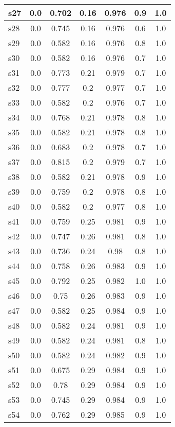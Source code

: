 \documentclass{article}
\begin{document}
\begin{tabular}{|l|c|c|c|c|c|c|}
\hline
s27 &0.0 & 0.702 & 0.16 & 0.976 & 0.9 & 1.0\\
\hline
s28 &0.0 & 0.745 & 0.16 & 0.976 & 0.6 & 1.0\\
\hline
s29 &0.0 & 0.582 & 0.16 & 0.976 & 0.8 & 1.0\\
\hline
s30 &0.0 & 0.582 & 0.16 & 0.976 & 0.7 & 1.0\\
\hline
s31 &0.0 & 0.773 & 0.21 & 0.979 & 0.7 & 1.0\\
\hline
s32 &0.0 & 0.777 & 0.2 & 0.977 & 0.7 & 1.0\\
\hline
s33 &0.0 & 0.582 & 0.2 & 0.976 & 0.7 & 1.0\\
\hline
s34 &0.0 & 0.768 & 0.21 & 0.978 & 0.8 & 1.0\\
\hline
s35 &0.0 & 0.582 & 0.21 & 0.978 & 0.8 & 1.0\\
\hline
s36 &0.0 & 0.683 & 0.2 & 0.978 & 0.7 & 1.0\\
\hline
s37 &0.0 & 0.815 & 0.2 & 0.979 & 0.7 & 1.0\\
\hline
s38 &0.0 & 0.582 & 0.21 & 0.978 & 0.9 & 1.0\\
\hline
s39 &0.0 & 0.759 & 0.2 & 0.978 & 0.8 & 1.0\\
\hline
s40 &0.0 & 0.582 & 0.2 & 0.977 & 0.8 & 1.0\\
\hline
s41 &0.0 & 0.759 & 0.25 & 0.981 & 0.9 & 1.0\\
\hline
s42 &0.0 & 0.747 & 0.26 & 0.981 & 0.8 & 1.0\\
\hline
s43 &0.0 & 0.736 & 0.24 & 0.98 & 0.8 & 1.0\\
\hline
s44 &0.0 & 0.758 & 0.26 & 0.983 & 0.9 & 1.0\\
\hline
s45 &0.0 & 0.792 & 0.25 & 0.982 & 1.0 & 1.0\\
\hline
s46 &0.0 & 0.75 & 0.26 & 0.983 & 0.9 & 1.0\\
\hline
s47 &0.0 & 0.582 & 0.25 & 0.984 & 0.9 & 1.0\\
\hline
s48 &0.0 & 0.582 & 0.24 & 0.981 & 0.9 & 1.0\\
\hline
s49 &0.0 & 0.582 & 0.24 & 0.981 & 0.8 & 1.0\\
\hline
s50 &0.0 & 0.582 & 0.24 & 0.982 & 0.9 & 1.0\\
\hline
s51 &0.0 & 0.675 & 0.29 & 0.984 & 0.9 & 1.0\\
\hline
s52 &0.0 & 0.78 & 0.29 & 0.984 & 0.9 & 1.0\\
\hline
s53 &0.0 & 0.745 & 0.29 & 0.984 & 0.9 & 1.0\\
\hline
s54 &0.0 & 0.762 & 0.29 & 0.985 & 0.9 & 1.0\\
\hline

\end{tabular}
\end{document}
